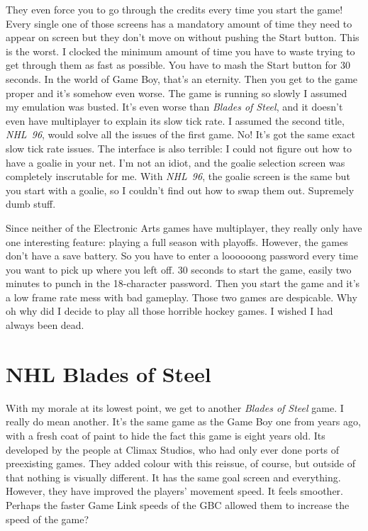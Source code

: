 \documentclass{book}
\let\oldcenter\center
\let\oldendcenter\endcenter
\renewenvironment{center}{\setlength\topsep{0pt}\oldcenter}{\oldendcenter}
\begin{document}
They even force you to go through the credits every time you start the game! Every single one of those screens has a mandatory amount of time they need to appear on screen but they don’t move on without pushing the Start button. This is the worst. I clocked the minimum amount of time you have to waste trying to get through them as fast as possible. You have to mash the Start button for 30 seconds. In the world of Game Boy, that’s an eternity. Then you get to the game proper and it’s somehow even worse. The game is running so slowly I assumed my emulation was busted. It’s even worse than \emph{Blades of Steel}, and it doesn’t even have multiplayer to explain its slow tick rate. I assumed the second title, \emph{NHL~96}, would solve all the issues of the first game. No! It’s got the same exact slow tick rate issues. The interface is also terrible: I could not figure out how to have a goalie in your net. I’m not an idiot, and the goalie selection screen was completely inscrutable for me. With \emph{NHL~96}, the goalie screen is the same but you start with a goalie, so I couldn’t find out how to swap them out. Supremely dumb stuff.

Since neither of the Electronic Arts games have multiplayer, they really only have one interesting feature: playing a full season with playoffs. However, the games don’t have a save battery. So you have to enter a loooooong password every time you want to pick up where you left off. 30 seconds to start the game, easily two minutes to punch in the 18-character password. Then you start the game and it’s a low frame rate mess with bad gameplay. Those two games are despicable. Why oh why did I decide to play all those horrible hockey games. I wished I had always been dead.

\FloatBarrier\needspace{10mm}\section*{NHL Blades of Steel}\nopagebreak[4]

\begin{center}
\quad\vspace{4pt}
\quad\vspace{4pt}
\end{center}

With my morale at its lowest point, we get to another \emph{Blades of Steel} game. I really do mean another. It’s the same game as the Game Boy one from years ago, with a fresh coat of paint to hide the fact this game is eight years old. Its developed by the people at Climax Studios, who had only ever done ports of preexisting games. They added colour with this reissue, of course, but outside of that nothing is visually different. It has the same goal screen and everything. However, they have improved the players’ movement speed. It feels smoother. Perhaps the faster Game Link speeds of the GBC allowed them to increase the speed of the game?
\end{document}
